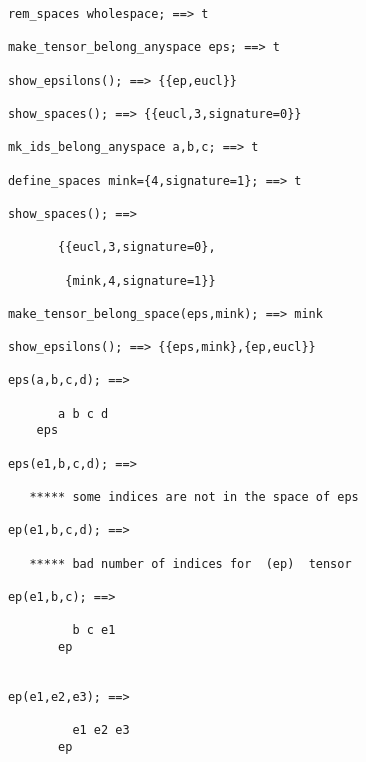 \begin{verbatim} 
      rem_spaces wholespace; ==> t

      make_tensor_belong_anyspace eps; ==> t

      show_epsilons(); ==> {{ep,eucl}}

      show_spaces(); ==> {{eucl,3,signature=0}}

      mk_ids_belong_anyspace a,b,c; ==> t

      define_spaces mink={4,signature=1}; ==> t

      show_spaces(); ==>

             {{eucl,3,signature=0},

              {mink,4,signature=1}}

      make_tensor_belong_space(eps,mink); ==> mink

      show_epsilons(); ==> {{eps,mink},{ep,eucl}}

      eps(a,b,c,d); ==>

             a b c d
          eps

      eps(e1,b,c,d); ==>

         ***** some indices are not in the space of eps

      ep(e1,b,c,d); ==>

         ***** bad number of indices for  (ep)  tensor

      ep(e1,b,c); ==>

               b c e1
             ep


      ep(e1,e2,e3); ==> 

               e1 e2 e3
             ep 
\end{verbatim}

